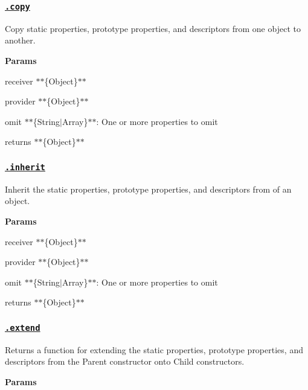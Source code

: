 \subsubsection*{\href{index.js#L264}{\tt .copy}}

Copy static properties, prototype properties, and descriptors from one object to another.

{\bfseries Params}


\begin{DoxyItemize}
\item {\ttfamily receiver} $\ast$$\ast$\{Object\}$\ast$$\ast$
\item {\ttfamily provider} $\ast$$\ast$\{Object\}$\ast$$\ast$
\item {\ttfamily omit} $\ast$$\ast$\{String$\vert$\+Array\}$\ast$$\ast$\+: One or more properties to omit
\item {\ttfamily returns} $\ast$$\ast$\{Object\}$\ast$$\ast$
\end{DoxyItemize}

\subsubsection*{\href{index.js#L299}{\tt .inherit}}

Inherit the static properties, prototype properties, and descriptors from of an object.

{\bfseries Params}


\begin{DoxyItemize}
\item {\ttfamily receiver} $\ast$$\ast$\{Object\}$\ast$$\ast$
\item {\ttfamily provider} $\ast$$\ast$\{Object\}$\ast$$\ast$
\item {\ttfamily omit} $\ast$$\ast$\{String$\vert$\+Array\}$\ast$$\ast$\+: One or more properties to omit
\item {\ttfamily returns} $\ast$$\ast$\{Object\}$\ast$$\ast$
\end{DoxyItemize}

\subsubsection*{\href{index.js#L343}{\tt .extend}}

Returns a function for extending the static properties, prototype properties, and descriptors from the {\ttfamily Parent} constructor onto {\ttfamily Child} constructors.

{\bfseries Params}


